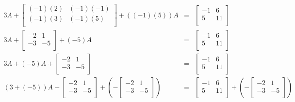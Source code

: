 \documentclass{ximera}
\begin{document}
\begin{example}
\[\begin{array}{rcl}
3A + \left[ \begin{array}{rr} (-1)(2) & (-1)(-1) \\ (-1)(3) & (-1)(5) \\ \end{array}\right] + ((-1)(5))A  & = & \left[ \begin{array}{rr} -1 & 6 \\ 5 & 11 \\ \end{array}\right]  \\  


3A + \left[ \begin{array}{rr} -2 & 1 \\ -3 & -5 \\ \end{array}\right] + (-5)A & = & \left[ \begin{array}{rr} -1 & 6 \\ 5 & 11 \\ \end{array}\right]  \\  


3A + (-5)A+ \left[ \begin{array}{rr} -2 & 1 \\ -3 & -5 \\ \end{array}\right]& = & \left[ \begin{array}{rr} -1 & 6 \\ 5 & 11 \\ \end{array}\right] \\  



(3+ (-5))A+ \left[ \begin{array}{rr} -2 & 1 \\ -3 & -5 \\ \end{array}\right] + \left(-\left[ \begin{array}{rr} -2 & 1 \\ -3 & -5 \\ \end{array}\right] \right)& = & \left[ \begin{array}{rr} -1 & 6 \\ 5 & 11 \\ \end{array}\right] + \left(-\left[ \begin{array}{rr} -2 & 1 \\ -3 & -5 \\ \end{array}\right] \right) \\  




\end{array}\]
\end{example}
\end{document}
